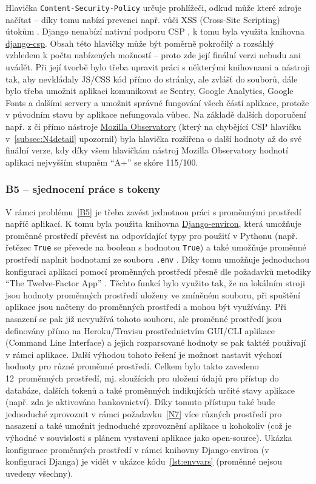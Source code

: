 Hlavička \verb|Content-Security-Policy| určuje prohlížeči, odkud může které zdroje načítat -- díky tomu nabízí prevenci např. vůči XSS (Cross-Site Scripting) útokům \cite{adamj}. Django nenabízí nativní podporu CSP \cite{adamj}, k tomu byla využita knihovna \href{https://django-csp.readthedocs.io/en/latest/}{django-csp}. Obsah této hlavičky může být poměrně pokročilý a rozsáhlý vzhledem k počtu nabízených možností \cite{adamj} -- proto zde její finální verzi nebudu ani uvádět. Při její tvorbě bylo třeba upravit práci s některými knihovnami a nástroji tak, aby nevkládaly JS/CSS kód přímo do stránky, ale zvlášť do souborů, dále bylo třeba umožnit aplikaci komunikovat se Sentry, Google Analytics, Google Fonts a dalšími servery a umožnit správné fungování všech částí aplikace, protože v původním stavu by aplikace nefungovala vůbec. Na základě dalších doporučení např. z \cite{dareboost} či přímo nástroje \href{https://observatory.mozilla.org/}{Mozilla Observatory} (který na chybějící CSP hlavičku v~\ref{subsec:N4detail} upozornil) byla hlavička rozšířena o další hodnoty až do své finální verze, kdy díky všem hlavičkám nástroj Mozilla Observatory hodnotí aplikaci nejvyšším stupněm \enquote{A+} se skóre 115/100.

\subsubsection{B5 -- sjednocení práce s tokeny}

V rámci problému~\ref{B5} je třeba zavést jednotnou práci s proměnnými prostředí napříč aplikací. K tomu byla použita knihovna \href{https://django-environ.readthedocs.io/en/latest/}{Django-environ}, která umožňuje proměnné prostředí převést na odpovídající typy pro použití v Pythonu (např. řetězec \verb|True| se převede na boolean s hodnotou \verb|True|) a také umožňuje proměnné prostředí naplnit hodnotami ze souboru \verb|.env| \cite{django-environ}. Díky tomu umožňuje jednoduchou konfiguraci aplikací pomocí proměnných prostředí přesně dle požadavků metodiky \enquote{The Twelve-Factor App} \cite{12factor-config, django-environ}. Těchto funkcí bylo využito tak, že na lokálním stroji jsou hodnoty proměnných prostředí uloženy ve zmíněném souboru, při spuštění aplikace jsou načteny do proměnných prostředí a mohou být využívány. Při nasazení se pak již nevyužívá tohoto souboru, ale proměnné prostředí jsou definovány přímo na Heroku/Travisu prostřednictvím GUI/CLI aplikace (Command Line Interface) a jejich rozparsované hodnoty se pak taktéž používají v rámci aplikace. Další výhodou tohoto řešení je možnost nastavit výchozí hodnoty pro různé proměnné prostředí. Celkem bylo takto zavedeno 12~proměnných prostředí, mj. sloužících pro uložení údajů pro přístup do databáze, dalších tokenů a také proměnných indikujících určité stavy aplikace (např. zda je aktivováno bankovnictví). Díky tomuto přístupu také bude jednoduché zprovoznit v rámci požadavku~\ref{N7} více různých prostředí pro nasazení a také umožnit jednoduché zprovoznění aplikace u kohokoliv (což je výhodné v souvislosti s plánem vystavení aplikace jako open-source). Ukázka konfigurace proměnných prostředí v rámci knihovny Django-environ (v konfiguraci Djanga) je vidět v ukázce kódu~\ref{lst:envvars} (proměnné nejsou uvedeny všechny).

